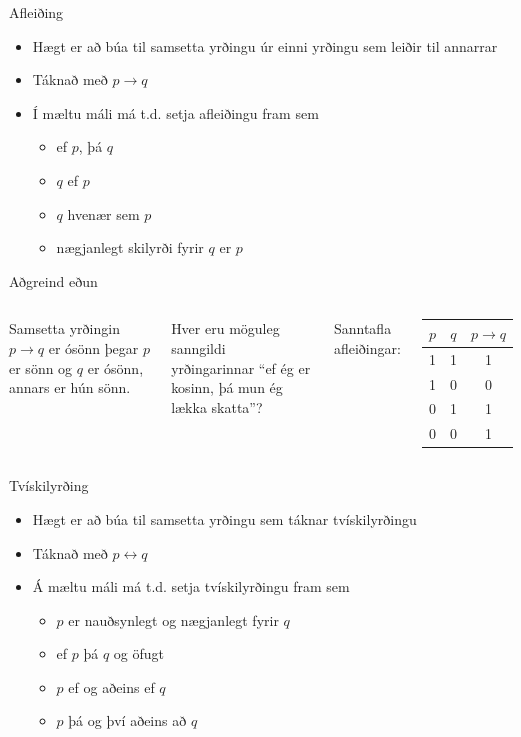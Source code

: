 \documentclass[handout]{beamer}
\begin{document}
\begin{frame}{Afleiðing}
\begin{itemize}
 \item Hægt er að búa til samsetta yrðingu úr einni yrðingu sem leiðir til annarrar
 \item Táknað með $p \to q$
 \item Í mæltu máli má t.d. setja afleiðingu fram sem
 \begin{itemize}
  \item ef $p$, þá $q$
  \item $q$ ef $p$
  \item $q$ hvenær sem $p$
  \item nægjanlegt skilyrði fyrir $q$ er $p$
 \end{itemize}
\end{itemize}
\end{frame}

\begin{frame}{Aðgreind eðun}
\begin{columns}
Samsetta yrðingin $p \to q$ er ósönn þegar $p$ er sönn og $q$ er ósönn, annars er hún sönn.

\vspace*{0.5cm}

Hver eru möguleg sanngildi yrðingarinnar ``ef ég er kosinn, þá mun ég lækka skatta''?

Sanntafla afleiðingar:
\begin{center}
\begin{tabular}{ccc}
\toprule
$p$&$q$&$p \to q$ \\
\midrule
1&1&1\\
1&0&0\\
0&1&1\\
0&0&1\\
\bottomrule
\end{tabular}
\end{center}
\end{columns}
\end{frame}

\begin{frame}{Tvískilyrðing}
\begin{itemize}
 \item Hægt er að búa til samsetta yrðingu sem táknar tvískilyrðingu
 \item Táknað með $p \leftrightarrow q$
 \item Á mæltu máli má t.d. setja tvískilyrðingu fram sem
 \begin{itemize}
  \item $p$ er nauðsynlegt og nægjanlegt fyrir $q$
  \item ef $p$ þá $q$ og öfugt
  \item $p$ ef og aðeins ef $q$
  \item $p$ þá og því aðeins að $q$
 \end{itemize}
\end{itemize}
\end{frame}
\end{document}
